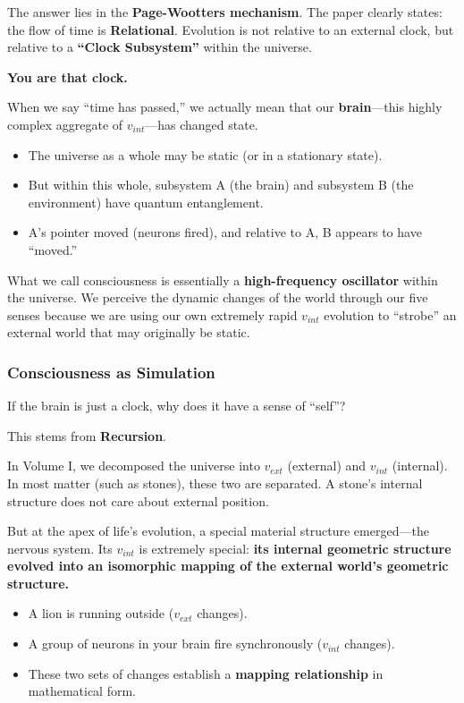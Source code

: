The answer lies in the \textbf{Page-Wootters mechanism}. The paper clearly states: the flow of time is \textbf{Relational}. Evolution is not relative to an external clock, but relative to a \textbf{``Clock Subsystem''} within the universe.

\textbf{You are that clock.}

When we say ``time has passed,'' we actually mean that our \textbf{brain}---this highly complex aggregate of $v_{int}$---has changed state.

\begin{itemize}
\item The universe as a whole may be static (or in a stationary state).

\item But within this whole, subsystem A (the brain) and subsystem B (the environment) have quantum entanglement.

\item A's pointer moved (neurons fired), and relative to A, B appears to have ``moved.''
\end{itemize}

What we call consciousness is essentially a \textbf{high-frequency oscillator} within the universe. We perceive the dynamic changes of the world through our five senses because we are using our own extremely rapid $v_{int}$ evolution to ``strobe'' an external world that may originally be static.

\subsubsection{Consciousness as Simulation}

If the brain is just a clock, why does it have a sense of ``self''?

This stems from \textbf{Recursion}.

In Volume I, we decomposed the universe into $v_{ext}$ (external) and $v_{int}$ (internal). In most matter (such as stones), these two are separated. A stone's internal structure does not care about external position.

But at the apex of life's evolution, a special material structure emerged---the nervous system. Its $v_{int}$ is extremely special: \textbf{its internal geometric structure evolved into an isomorphic mapping of the external world's geometric structure.}

\begin{itemize}
\item A lion is running outside ($v_{ext}$ changes).

\item A group of neurons in your brain fire synchronously ($v_{int}$ changes).

\item These two sets of changes establish a \textbf{mapping relationship} in mathematical form.
\end{itemize}

